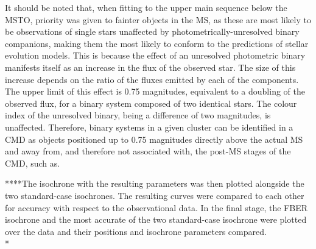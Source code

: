 \documentclass[12pt, a4paper]{report}
\begin{document}
It should be noted that, when fitting  to the upper main sequence below the MSTO, priority was given to fainter objects in the MS, as these are most likely to be observations of single stars unaffected by photometrically-unresolved binary companions, making them the most likely to conform to the predictions of stellar evolution models. This is because the effect of an unresolved photometric binary manifests itself as an increase in the flux of the observed star. The size of this increase depends on the ratio of the fluxes emitted by each of the components. The upper limit of this effect is 0.75 magnitudes, equivalent to a doubling of the observed flux, for a binary system composed of two identical stars. The colour index of the unresolved binary, being a difference of two magnitudes, is unaffected. Therefore, binary systems in a given cluster can be identified in a CMD as objects positioned up to 0.75 magnitudes directly above the actual MS and away from, and therefore not associated with, the post-MS stages of the CMD, such as.


 ****The isochrone with the resulting parameters was then plotted alongside the two standard-case isochrones. The resulting curves were compared to each other for accuracy with respect to the observational data. In the final stage, the FBER isochrone and the most accurate of the two standard-case isochrone were plotted over the data and their positions and isochrone parameters compared.\\*
\end{document}
